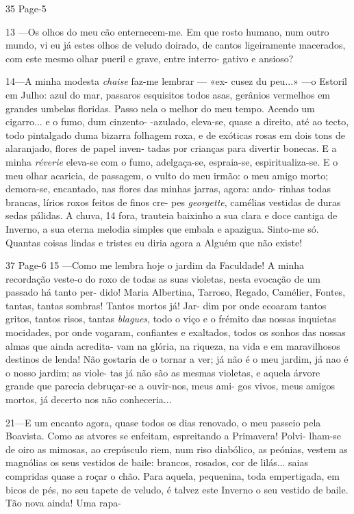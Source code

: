 35
Page-5

13 —Os olhos do meu cão enternecem-me. Em que
rosto humano, num outro mundo, vi eu já estes olhos
de veludo doirado, de cantos ligeiramente macerados,
com este mesmo olhar pueril e grave, entre interro-
gativo e ansioso?

14—A minha modesta \textit{chaise} faz-me lembrar — «ex-
cusez du peu...» —o Estoril em Julho: azul do mar,
passaros esquisitos todos asas, gerânios vermelhos em
grandes umbelas floridas. Passo nela o melhor do meu
tempo. Acendo um cigarro... e o fumo, dum cinzento-
-azulado, eleva-se, quase a direito, até ao tecto, todo
pintalgado duma bizarra folhagem roxa, e de exóticas
rosas em dois tons de alaranjado, flores de papel inven-
tadas por crianças para divertir bonecas. E a minha
\textit{réverie} eleva-se com o fumo, adelgaça-se, espraia-se,
espiritualiza-se. E o meu olhar acaricia, de passagem,
o vulto do meu irmão: o meu amigo morto; demora-se,
encantado, nas flores das minhas jarras, agora: ando-
rinhas todas brancas, lírios roxos feitos de finos cre-
pes \textit{georgette}, camélias vestidas de duras sedas
pálidas. A chuva, 14 fora, trauteia baixinho a sua clara
e doce cantiga de Inverno, a sua eterna melodia simples
que embala e apazigua. Sinto-me só. Quantas coisas
lindas e tristes eu diria agora a Alguém que não
existe!

 

37
Page-6
15 —Como me lembra hoje o jardim da Faculdade!
A minha recordação veste-o do roxo de todas as suas
violetas, nesta evocação de um passado há tanto per-
dido! Maria Albertina, Tarroso, Regado, Camélier,
Fontes, tantas, tantas sombras! Tantos mortos já! Jar-
dim por onde ecoaram tantos gritos, tantos risos, tantas
\textit{blagues}, todo o viço e o frémito das nossas inquietas
mocidades, por onde vogaram, confiantes e exaltados,
todos os sonhos das nossas almas que ainda acredita-
vam na glória, na riqueza, na vida e em maravilhosos
destinos de lenda! Não gostaria de o tornar a ver; já
não é o meu jardim, já nao é o nosso jardim; as viole-
tas já não são as mesmas violetas, e aquela árvore
grande que parecia debruçar-se a ouvir-nos, meus ami-
gos vivos, meus amigos mortos, já decerto nos não
conheceria...

21—E um encanto agora, quase todos os dias
renovado, o meu passeio pela Boavista. Como as
atvores se enfeitam, espreitando a Primavera! Polvi-
lham-se de oiro as mimosas, ao crepúsculo riem, num
riso diabólico, as peónias, vestem as magnólias os
seus vestidos de baile: brancos, rosados, cor de lilás...
saias compridas quase a roçar o chão. Para aquela,
pequenina, toda empertigada, em bicos de pés, no
seu tapete de veludo, é talvez este Inverno o seu
vestido de baile. Tão nova ainda! Uma rapa-

